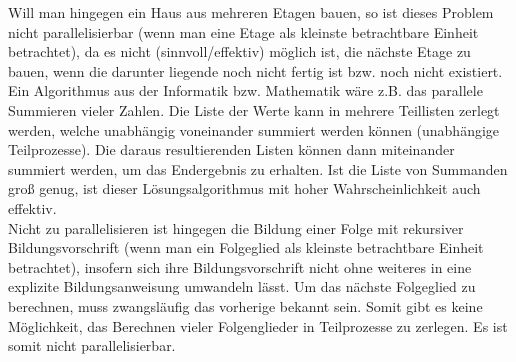 Will man hingegen ein Haus aus mehreren Etagen bauen, so ist dieses Problem nicht parallelisierbar (wenn man eine Etage als kleinste betrachtbare Einheit betrachtet), da es nicht (sinnvoll/effektiv) möglich ist, die nächste Etage zu bauen, wenn die darunter liegende noch nicht fertig ist bzw. noch nicht existiert.\\
Ein Algorithmus aus der Informatik bzw. Mathematik wäre z.B. das parallele Summieren vieler Zahlen. Die Liste der Werte kann in mehrere Teillisten zerlegt werden, welche unabhängig voneinander summiert werden können (unabhängige Teilprozesse). Die daraus resultierenden Listen können dann miteinander summiert werden, um das Endergebnis zu erhalten. Ist die Liste von Summanden groß genug, ist dieser Lösungsalgorithmus mit hoher Wahrscheinlichkeit auch effektiv.\\
Nicht zu parallelisieren ist hingegen die Bildung einer Folge mit rekursiver Bildungsvorschrift (wenn man ein Folgeglied als kleinste betrachtbare Einheit betrachtet), insofern sich ihre Bildungsvorschrift nicht ohne weiteres in eine explizite Bildungsanweisung umwandeln lässt. Um das nächste Folgeglied zu berechnen, muss zwangsläufig das vorherige bekannt sein. Somit gibt es keine Möglichkeit, das Berechnen vieler Folgenglieder in Teilprozesse zu zerlegen. Es ist somit nicht parallelisierbar.

